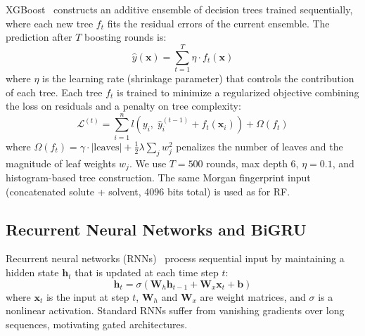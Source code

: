 \documentclass[11pt,a4paper]{article}
\newcommand{\vect}[1]{\mathbf{#1}}
\newcommand{\matr}[1]{\mathbf{#1}}
\begin{document}
XGBoost~\cite{chen2016xgboost} constructs an additive ensemble of decision trees trained sequentially, where each new tree $f_t$ fits the residual errors of the current ensemble.
The prediction after $T$ boosting rounds is:
\begin{equation}
    \hat{y}(\vect{x}) = \sum_{t=1}^{T} \eta \cdot f_t(\vect{x})
\end{equation}
where $\eta$ is the learning rate (shrinkage parameter) that controls the contribution of each tree.
Each tree $f_t$ is trained to minimize a regularized objective combining the loss on residuals and a penalty on tree complexity:
\begin{equation}
    \mathcal{L}^{(t)} = \sum_{i=1}^{n} l\!\left(y_i,\; \hat{y}_i^{(t-1)} + f_t(\vect{x}_i)\right) + \Omega(f_t)
\end{equation}
where $\Omega(f_t) = \gamma \cdot |\text{leaves}| + \tfrac{1}{2}\lambda \sum_j w_j^2$ penalizes the number of leaves and the magnitude of leaf weights $w_j$.
We use $T = 500$ rounds, max depth 6, $\eta = 0.1$, and histogram-based tree construction.
The same Morgan fingerprint input (concatenated solute + solvent, 4096 bits total) is used as for RF.


\subsection{Recurrent Neural Networks and BiGRU}
\label{sec:bigru}

Recurrent neural networks (RNNs)~\cite{elman1990finding} process sequential input by maintaining a hidden state $\vect{h}_t$ that is updated at each time step $t$:
\begin{equation}
    \vect{h}_t = \sigma(\matr{W}_h \vect{h}_{t-1} + \matr{W}_x \vect{x}_t + \vect{b})
\end{equation}
where $\vect{x}_t$ is the input at step $t$, $\matr{W}_h$ and $\matr{W}_x$ are weight matrices, and $\sigma$ is a nonlinear activation.
Standard RNNs suffer from vanishing gradients over long sequences, motivating gated architectures.
\end{document}
